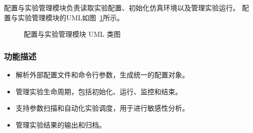 配置与实验管理模块负责读取实验配置、初始化仿真环境以及管理实验运行。
配置与实验管理模块的UML如图~\ref{fig:uml_config}所示。

\begin{figure}[H]
  \centering
  \resizebox{0.25\linewidth}{!}{}
  \caption{配置与实验管理模块 UML 类图}
  \label{fig:uml_config}
\end{figure}

\subsubsection{功能描述}
\begin{itemize}
  \item 解析外部配置文件和命令行参数，生成统一的配置对象。
  \item 管理实验生命周期，包括初始化、运行、监控和结束。
  \item 支持参数扫描和自动化实验调度，用于进行敏感性分析。
  \item 管理实验结果的输出和归档。
\end{itemize}

